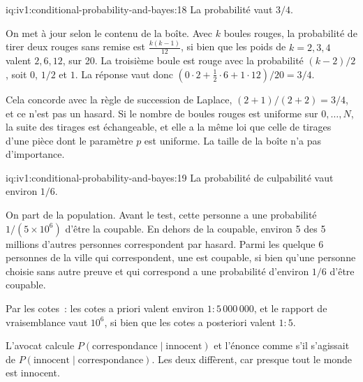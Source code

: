 \begin{solution}{iq:iv1:conditional-probability-and-bayes:18}
La probabilité vaut $3/4$.

On met à jour selon le contenu de la boîte. Avec $k$ boules rouges, la probabilité de tirer deux rouges sans remise est $\frac{k(k-1)}{12}$, si bien que les poids de $k = 2, 3, 4$ valent $2, 6, 12$, sur 20. La troisième boule est rouge avec la probabilité $(k - 2)/2$, soit $0$, $1/2$ et $1$. La réponse vaut donc $(0 \cdot 2 + \tfrac12 \cdot 6 + 1 \cdot 12)/20 = 3/4$.

Cela concorde avec la règle de succession de Laplace, $(2 + 1)/(2 + 2) = 3/4$, et ce n'est pas un hasard. Si le nombre de boules rouges est uniforme sur $0, \dots, N$, la suite des tirages est échangeable, et elle a la même loi que celle de tirages d'une pièce dont le paramètre $p$ est uniforme. La taille de la boîte n'a pas d'importance.

\end{solution}

\begin{solution}{iq:iv1:conditional-probability-and-bayes:19}
La probabilité de culpabilité vaut environ $1/6$.

On part de la population. Avant le test, cette personne a une probabilité $1/(5 \times 10^6)$ d'être la coupable. En dehors de la coupable, environ 5 des 5 millions d'autres personnes correspondent par hasard. Parmi les quelque 6 personnes de la ville qui correspondent, une est coupable, si bien qu'une personne choisie sans autre preuve et qui correspond a une probabilité d'environ $1/6$ d'être coupable.

Par les cotes~: les cotes a priori valent environ $1 : 5\,000\,000$, et le rapport de vraisemblance vaut $10^6$, si bien que les cotes a posteriori valent $1 : 5$.

L'avocat calcule $P(\text{correspondance} \mid \text{innocent})$ et l'énonce comme s'il s'agissait de $P(\text{innocent} \mid \text{correspondance})$. Les deux diffèrent, car presque tout le monde est innocent.

\end{solution}

